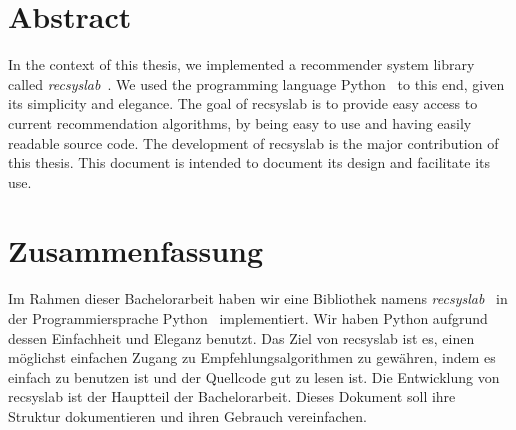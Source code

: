 \begingroup
\let\clearpage\relax
\let\cleardoublepage\relax
\let\cleardoublepage\relax

\chapter*{Abstract}
In the context of this thesis, we implemented a recommender system library called \textit{recsyslab}~\cite{recsyslab}. We used the programming language Python~\cite{python} to this end, given its simplicity and elegance. The goal of recsyslab is
to provide easy access to current recommendation algorithms, by being easy to use and 
having easily readable source code.
The development of recsyslab is the major contribution of this thesis. 
This document is intended to document its design and facilitate its use.


\vfill

\chapter*{Zusammenfassung}
Im Rahmen dieser Bachelorarbeit haben wir eine Bibliothek namens \textit{recsyslab}~\cite{recsyslab} 
in der Programmiersprache Python~\cite{python} implementiert. Wir haben Python aufgrund dessen Einfachheit und Eleganz benutzt. Das Ziel von recsyslab ist es, einen m\"oglichst einfachen Zugang zu 
Empfehlungsalgorithmen zu gew\"ahren, indem es einfach zu benutzen ist und der Quellcode gut zu lesen ist.
Die Entwicklung von recsyslab ist der Hauptteil der Bachelorarbeit.
Dieses Dokument soll ihre Struktur dokumentieren und ihren Gebrauch vereinfachen.


\endgroup			

\vfill

\cleardoublepage
